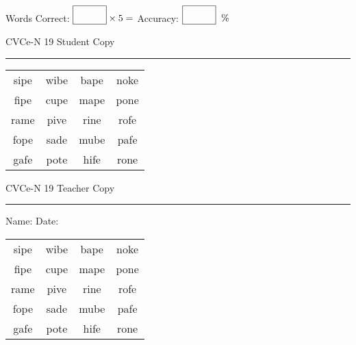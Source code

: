 \documentclass{memoir}
\begin{document}
\small

Words Correct: $\fbox{\phantom{\huge 100}} \times 5 = $ Accuracy: $\fbox{\phantom{\huge 100}}\;\; \%$ 

\vfill

\newpage


\footnotesize \noindent
CVCe-N 19 \hfill Student Copy
\smallskip
\hrule

\Large

\setlength{\tabcolsep}{14pt}
\def\arraystretch{2}

{\selectfont


\begin{vplace}[0.5]
\begin{center}
\begin{tabular}{cccc}
sipe & wibe & bape & noke \\
fipe & cupe & mape & pone \\
rame & pive & rine & rofe \\
fope & sade & mube & pafe \\
gafe & pote & hife & rone \\
\end{tabular}
\end{center}
\end{vplace}

}

\newpage

\footnotesize \noindent
CVCe-N 19 \hfill Teacher Copy
\smallskip
\hrule

\small

\vfill

\noindent
Name: \underline{\hspace{1.75in}} \hfill Date: \underline{\hspace{1in}}

\Large

{\selectfont


\begin{vplace}[0.5]
\begin{center}
\begin{tabular}{cccc}
sipe & wibe & bape & noke \\
fipe & cupe & mape & pone \\
rame & pive & rine & rofe \\
fope & sade & mube & pafe \\
gafe & pote & hife & rone \\
\end{tabular}
\end{center}
\end{vplace}



}
\end{document}
